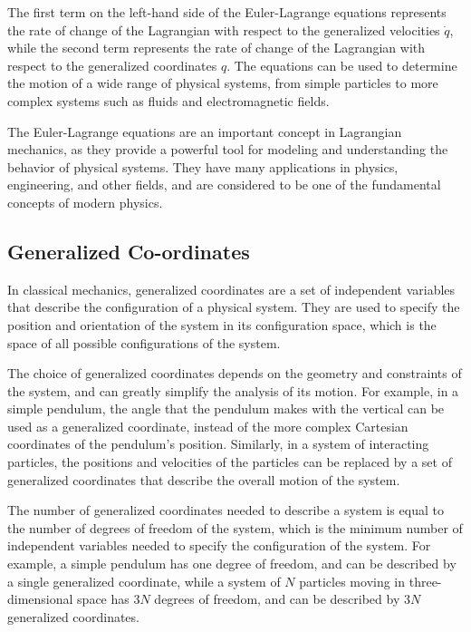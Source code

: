 \documentclass[12pt, a4paper]{article} %
\begin{document}
The first term on the left-hand side of the Euler-Lagrange equations represents the rate of change of the Lagrangian with respect to the generalized velocities $\dot{q}$, while the second term represents the rate of change of the Lagrangian with respect to the generalized coordinates $q$. The equations can be used to determine the motion of a wide range of physical systems, from simple particles to more complex systems such as fluids and electromagnetic fields.

The Euler-Lagrange equations are an important concept in Lagrangian mechanics, as they provide a powerful tool for modeling and understanding the behavior of physical systems. They have many applications in physics, engineering, and other fields, and are considered to be one of the fundamental concepts of modern physics.

\subsection{Generalized Co-ordinates}

In classical mechanics, generalized coordinates are a set of independent variables that describe the configuration of a physical system. They are used to specify the position and orientation of the system in its configuration space, which is the space of all possible configurations of the system.

The choice of generalized coordinates depends on the geometry and constraints of the system, and can greatly simplify the analysis of its motion. For example, in a simple pendulum, the angle that the pendulum makes with the vertical can be used as a generalized coordinate, instead of the more complex Cartesian coordinates of the pendulum's position. Similarly, in a system of interacting particles, the positions and velocities of the particles can be replaced by a set of generalized coordinates that describe the overall motion of the system.

The number of generalized coordinates needed to describe a system is equal to the number of degrees of freedom of the system, which is the minimum number of independent variables needed to specify the configuration of the system. For example, a simple pendulum has one degree of freedom, and can be described by a single generalized coordinate, while a system of $N$ particles moving in three-dimensional space has $3N$ degrees of freedom, and can be described by $3N$ generalized coordinates.

\BgThispage
\end{document}
